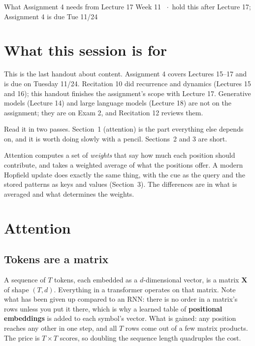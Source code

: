 \documentclass[11pt]{article}
\begin{document}
  {What Assignment 4 needs from Lecture 17}
  {Week 11 \ $\cdot$\ hold this after Lecture 17; Assignment 4 is due Tue 11/24}

\section*{What this session is for}

This is the last handout about content. Assignment 4 covers Lectures 15--17 and
is due on Tuesday 11/24. Recitation 10 did recurrence and dynamics (Lectures 15
and 16); this handout finishes the assignment's scope with Lecture 17. Generative
models (Lecture 14) and large language models (Lecture 18) are not on the
assignment; they are on Exam 2, and Recitation 12 reviews them.

Read it in two passes. Section~1 (attention) is the part everything else depends
on, and it is worth doing slowly with a pencil. Sections~2 and 3 are short.

\begin{keybox}
 Attention computes a set of \emph{weights} that say how much
each position should contribute, and takes a weighted average of what the
positions offer. A modern Hopfield update does exactly the same thing, with the
cue as the query and the stored patterns as keys and values (Section~3). The
differences are in what is averaged and what determines the weights.
\end{keybox}

\section{Attention}

\subsection{Tokens are a matrix}

A sequence of $T$ tokens, each embedded as a $d$-dimensional vector, is a matrix
$\boldsymbol{X}$ of shape $(T, d)$. Everything in a transformer operates on that
matrix. Note what has been given up compared to an RNN: there is no order in a
matrix's rows unless you put it there, which is why a learned table of
\textbf{positional embeddings} is added to each symbol's vector. What is gained:
any position reaches any other in one step, and all $T$ rows come out of a few
matrix products. The price is $T\times T$ scores, so doubling the sequence
length quadruples the cost.
\end{document}
